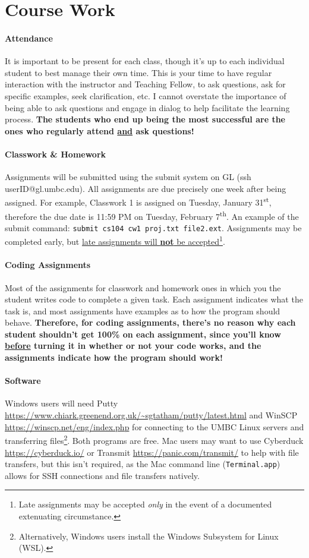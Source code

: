 \documentclass[letter,11pt]{article}
\begin{document}
\section*{Course Work}\label{sec:coursework}
\paragraph{Attendance}It is important to be present for each class, though it's up to each individual student to best manage their own time. This is your time to have regular interaction with the instructor and Teaching Fellow, to ask questions, ask for specific examples, seek clarification, etc. I cannot overstate the importance of being able to ask questions and engage in dialog to help facilitate the learning process. \textbf{The students who end up being the most successful are the ones who regularly attend \underline{and} ask questions!}

\paragraph{Classwork \& Homework}Assignments will be submitted using the submit system on GL (ssh userID@gl.umbc.edu). All assignments are due precisely one week after being assigned. For example, Classwork 1 is assigned on Tuesday, January 31\textsuperscript{st}, therefore the due date is 11:59 PM on Tuesday, February 7\textsuperscript{th}. An example of the submit command: \texttt{submit cs104 cw1 proj.txt file2.ext}. Assignments may be completed early, but \underline{\hypertarget{cwhw}{late assignments} will \textbf{not} be accepted}\footnote{Late assignments may be accepted \textit{only} in the event of a documented extenuating circumstance.}.

\paragraph{Coding Assignments}Most of the assignments for classwork and homework ones in which you the student writes code to complete a given task. Each assignment indicates what the task is, and most assignments have examples as to how the program should behave. \textbf{Therefore, for coding assignments, there's no reason why each student shouldn't get 100\% on each assignment, since you'll know \underline{before} turning it in whether or not your code works, and the assignments indicate how the program should work!}

\paragraph{Software} Windows users will need Putty \url{https://www.chiark.greenend.org.uk/~sgtatham/putty/latest.html} and WinSCP \url{https://winscp.net/eng/index.php} for connecting to the UMBC Linux servers and transferring files\footnote{Alternatively, Windows users install the Windows Subsystem for Linux (WSL).}. Both programs are free. Mac users may want to use Cyberduck \url{https://cyberduck.io/} or Transmit \url{https://panic.com/transmit/} to help with file transfers, but this isn't required, as the Mac command line (\texttt{Terminal.app}) allows for SSH connections and file transfers natively.
\end{document}
